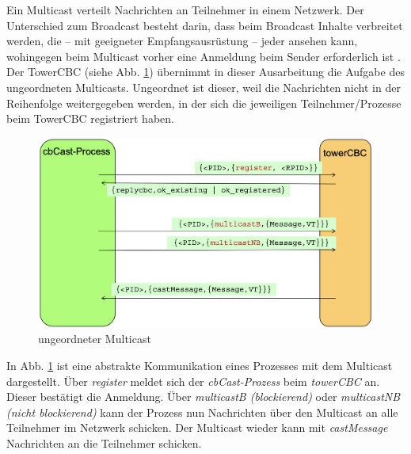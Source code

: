 Ein Multicast verteilt Nachrichten an Teilnehmer in einem Netzwerk. Der Unterschied zum Broadcast besteht darin, dass beim Broadcast Inhalte verbreitet werden, die – mit geeigneter Empfangsausrüstung – jeder ansehen kann, wohingegen beim Multicast vorher eine Anmeldung beim Sender erforderlich ist \cite{wiki:Multicast}.\\
Der TowerCBC (siehe Abb. \ref{fig:towerCBC}) übernimmt in dieser Ausarbeitung die Aufgabe des ungeordneten Multicasts. Ungeordnet ist dieser, weil die Nachrichten nicht in der Reihenfolge weitergegeben werden, in der sich die jeweiligen Teilnehmer/Prozesse beim TowerCBC registriert haben.

\begin{figure}[htbp]
\begin{center}
\includegraphics[scale=0.4]{Latex/Bilder/towerCBC_1.png}
\caption{\label{fig:towerCBC} ungeordneter Multicast \cite{Aufgabenstellung}} 
\end{center}
\end{figure}

In Abb. \ref{fig:towerCBC} ist eine abstrakte Kommunikation eines Prozesses mit dem Multicast dargestellt. Über \textit{register} meldet sich der \textit{cbCast-Prozess} beim \textit{towerCBC} an. Dieser bestätigt die Anmeldung. Über \textit{multicastB (blockierend)} oder \textit{multicastNB (nicht blockierend)} kann der Prozess nun Nachrichten über den Multicast an alle Teilnehmer im Netzwerk schicken. Der Multicast wieder kann mit \textit{castMessage} Nachrichten an die Teilnehmer schicken.
